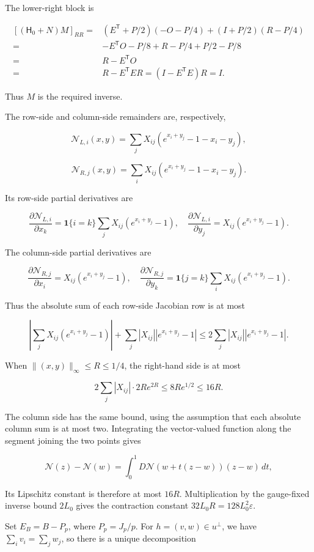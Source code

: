 \documentclass[11pt,a4paper]{article}
\begin{document}
The lower-right block is

\[
\begin{aligned}
[(\mathsf H_0+N)M]_{RR}
={}&(E^{\mathsf T}+P/2)(-O-P/4)+(I+P/2)(R-P/4)\\
={}&-E^{\mathsf T}O-P/8+R-P/4+P/2-P/8\\
={}&R-E^{\mathsf T}O\\
={}&R-E^{\mathsf T}ER=(I-E^{\mathsf T}E)R=I.
\end{aligned}
\]

Thus \(M\) is the required inverse.

The row-side and column-side remainders are, respectively,

\[
\mathcal N_{L,i}(x,y)=\sum_jX_{ij}(e^{x_i+y_j}-1-x_i-y_j),
\]

\[
\mathcal N_{R,j}(x,y)=\sum_iX_{ij}(e^{x_i+y_j}-1-x_i-y_j).
\]

Its row-side partial derivatives are

\[
\frac{\partial\mathcal N_{L,i}}{\partial x_k}
=\mathbf1\{i=k\}\sum_jX_{ij}(e^{x_i+y_j}-1),\quad
\frac{\partial\mathcal N_{L,i}}{\partial y_j}=X_{ij}(e^{x_i+y_j}-1).
\]

The column-side partial derivatives are

\[
\frac{\partial\mathcal N_{R,j}}{\partial x_i}=X_{ij}(e^{x_i+y_j}-1),\quad
\frac{\partial\mathcal N_{R,j}}{\partial y_k}
=\mathbf1\{j=k\}\sum_iX_{ij}(e^{x_i+y_j}-1).
\]

Thus the absolute sum of each row-side Jacobian row is at most

\[
\left|\sum_jX_{ij}(e^{x_i+y_j}-1)\right|
+\sum_j|X_{ij}||e^{x_i+y_j}-1|
\le2\sum_j|X_{ij}||e^{x_i+y_j}-1|.
\]

When \(\|(x,y)\|_\infty\le R\le1/4\), the right-hand side is at most

\[
2\sum_j|X_{ij}|\cdot2Re^{2R}\le8Re^{1/2}\le16R.
\]

The column side has the same bound, using the assumption that each absolute column sum is at most two. Integrating the vector-valued function along the segment joining the two points gives

\[
\mathcal N(z)-\mathcal N(w)=\int_0^1D\mathcal N(w+t(z-w))(z-w)\,dt,
\]

Its Lipschitz constant is therefore at most \(16R\). Multiplication by the gauge-fixed inverse bound \(2L_0\) gives the contraction constant \(32L_0R=128L_0^2\varepsilon\).

Set \(E_B=B-P_p\), where \(P_p=J_p/p\). For \(h=(v,w)\in u^\perp\), we have \(\sum_iv_i=\sum_jw_j\), so there is a unique decomposition
\end{document}
